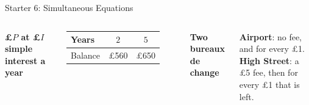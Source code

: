 \documentclass{beamer}
\newcommand{\receipt}[4]{%
  \draw[fill=yellow!4, draw=black!60]
    (#1,0) -- ({#1+1.95},0) -- ({#1+1.95},-1.3)
    \foreach \i in {1,...,6} { -- ({#1+1.95-0.325*\i+0.1625},-1.38) -- ({#1+1.95-0.325*\i},-1.3) }
    -- cycle;
  \node[anchor=west] at ({#1+0.1},-0.25) {#2};
  \node[anchor=west] at ({#1+0.1},-0.58) {#3};
  \draw[black!50, dashed] ({#1+0.1},-0.8) -- ({#1+1.85},-0.8);
  \node[anchor=west, font=\scriptsize\bfseries] at ({#1+0.1},-1.05) {Total};
  \node[anchor=east] at ({#1+1.85},-1.05) {#4};
}
\begin{document}
\begin{frame}[t]{Starter 6: Simultaneous Equations}
\hypertarget{q-st6}{}
\begin{columns}[T,onlytextwidth]

\vspace{-0.4em}

\vspace{0.8em}
{\scriptsize\bfseries \pounds$P$ at \pounds$I$ simple interest a year}\par
\vspace{0.2em}
{\scriptsize
\renewcommand{\arraystretch}{1.3}
\begin{tabular}{l|c|c}
  Years   & $2$        & $5$\\ \hline
  Balance & \pounds560 & \pounds650
\end{tabular}}

\vspace{0.9em}
{\scriptsize\bfseries Two bureaux de change}\par
\vspace{0.2em}
\parbox{\linewidth}{\raggedright\scriptsize
  \textbf{Airport}: no fee, and  for every \pounds1.\\[2pt]
  \textbf{High Street}: a \pounds5 fee, then  for every \pounds1 that is left.}


\end{columns}
\end{frame}
\end{document}
